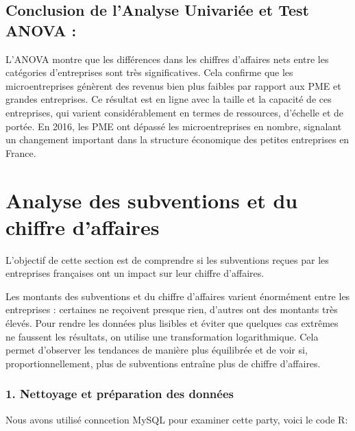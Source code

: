 \documentclass[mstat,12pt]{unswthesis}
\begin{document}
\subsection{Conclusion de l'Analyse Univariée et Test ANOVA
:}\label{conclusion-de-lanalyse-univariuxe9e-et-test-anova}

L'ANOVA montre que les différences dans les chiffres d'affaires nets
entre les catégories d'entreprises sont très significatives. Cela
confirme que les microentreprises génèrent des revenus bien plus faibles
par rapport aux PME et grandes entreprises. Ce résultat est en ligne
avec la taille et la capacité de ces entreprises, qui varient
considérablement en termes de ressources, d'échelle et de portée. En
2016, les PME ont dépassé les microentreprises en nombre, signalant un
changement important dans la structure économique des petites
entreprises en France.

\newpage

\section{\texorpdfstring{\textbf{Analyse des subventions et du chiffre
d'affaires}}{Analyse des subventions et du chiffre d'affaires}}\label{analyse-des-subventions-et-du-chiffre-daffaires}

\medskip

L'objectif de cette section est de comprendre si les subventions reçues
par les entreprises françaises ont un impact sur leur chiffre
d'affaires.

Les montants des subventions et du chiffre d'affaires varient énormément
entre les entreprises : certaines ne reçoivent presque rien, d'autres
ont des montants très élevés. Pour rendre les données plus lisibles et
éviter que quelques cas extrêmes ne faussent les résultats, on utilise
une transformation logarithmique. Cela permet d'observer les tendances
de manière plus équilibrée et de voir si, proportionnellement, plus de
subventions entraîne plus de chiffre d'affaires.

\subsubsection{1. Nettoyage et préparation des
données}\label{nettoyage-et-pruxe9paration-des-donnuxe9es}

\medskip

Nous avons utilisé conncetion MySQL pour examiner cette party, voici le
code R:

\medskip
\end{document}
